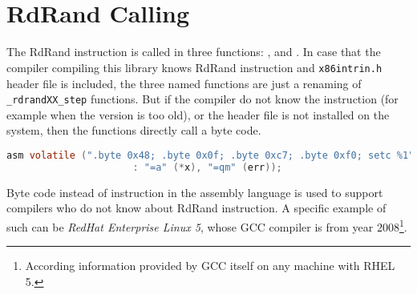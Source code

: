 \\


\\


\section{RdRand Calling}
\par{
The RdRand instruction is called in three functions: ,  and . In case that the compiler compiling this library knows RdRand instruction and {\tt x86intrin.h} header file is included, the three named functions are just a renaming of {\tt \_rdrandXX\_step} functions. But if the compiler do not know the instruction (for example when the version is too old), or the header file is not installed on the system, then the functions directly call a byte code.
}
\begin{lstlisting}[frame=none, basicstyle=\footnotesize\ttfamily, language=C, numbers=none, numberstyle=\tiny\color{black},caption= {Byte code called in {\tt rdrand64\_step}.}]
 asm volatile (".byte 0x48; .byte 0x0f; .byte 0xc7; .byte 0xf0; setc %1"
                      : "=a" (*x), "=qm" (err));
\end{lstlisting}

\par{
Byte code instead of instruction in the assembly language is used to support compilers who do not know about RdRand instruction. A specific example of such can be {\em RedHat Enterprise Linux 5}, whose GCC compiler is from year 2008\footnote{According information provided by GCC itself on any machine with RHEL 5.}. 
}

